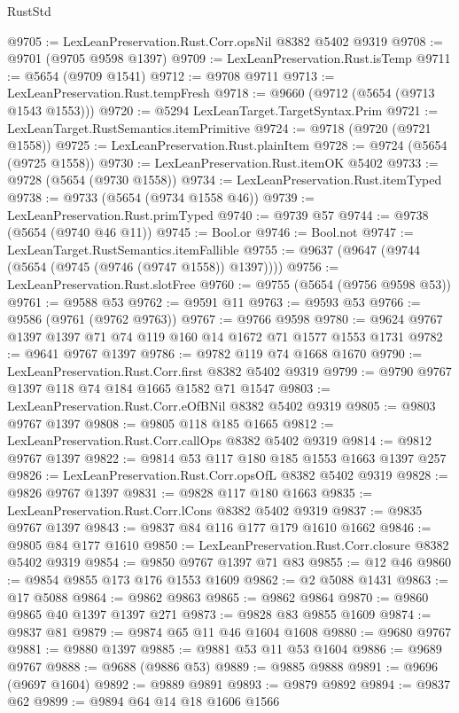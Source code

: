 \begin{lexlean}{RustStd}
\begin{coremodule}
@9705 := LexLeanPreservation.Rust.Corr.opsNil @8382 @5402 @9319
@9708 := @9701 (@9705 @9598 @1397)
@9709 := LexLeanPreservation.Rust.isTemp
@9711 := @5654 (@9709 @1541)
@9712 := @9708 @9711
@9713 := LexLeanPreservation.Rust.tempFresh
@9718 := @9660 (@9712 (@5654 (@9713 @1543 @1553)))
@9720 := @5294 LexLeanTarget.TargetSyntax.Prim
@9721 := LexLeanTarget.RustSemantics.itemPrimitive
@9724 := @9718 (@9720 (@9721 @1558))
@9725 := LexLeanPreservation.Rust.plainItem
@9728 := @9724 (@5654 (@9725 @1558))
@9730 := LexLeanPreservation.Rust.itemOK @5402
@9733 := @9728 (@5654 (@9730 @1558))
@9734 := LexLeanPreservation.Rust.itemTyped
@9738 := @9733 (@5654 (@9734 @1558 @46))
@9739 := LexLeanPreservation.Rust.primTyped
@9740 := @9739 @57
@9744 := @9738 (@5654 (@9740 @46 @11))
@9745 := Bool.or
@9746 := Bool.not
@9747 := LexLeanTarget.RustSemantics.itemFallible
@9755 := @9637 (@9647 (@9744 (@5654 (@9745 (@9746 (@9747 @1558)) @1397))))
@9756 := LexLeanPreservation.Rust.slotFree
@9760 := @9755 (@5654 (@9756 @9598 @53))
@9761 := @9588 @53
@9762 := @9591 @11
@9763 := @9593 @53
@9766 := @9586 (@9761 (@9762 @9763))
@9767 := @9766 @9598
@9780 := @9624 @9767 @1397 @1397 @71 @74 @119 @160 @14 @1672 @71 @1577 @1553 @1731
@9782 := @9641 @9767 @1397
@9786 := @9782 @119 @74 @1668 @1670
@9790 := LexLeanPreservation.Rust.Corr.first @8382 @5402 @9319
@9799 := @9790 @9767 @1397 @118 @74 @184 @1665 @1582 @71 @1547
@9803 := LexLeanPreservation.Rust.Corr.eOfBNil @8382 @5402 @9319
@9805 := @9803 @9767 @1397
@9808 := @9805 @118 @185 @1665
@9812 := LexLeanPreservation.Rust.Corr.callOps @8382 @5402 @9319
@9814 := @9812 @9767 @1397
@9822 := @9814 @53 @117 @180 @185 @1553 @1663 @1397 @257
@9826 := LexLeanPreservation.Rust.Corr.opsOfL @8382 @5402 @9319
@9828 := @9826 @9767 @1397
@9831 := @9828 @117 @180 @1663
@9835 := LexLeanPreservation.Rust.Corr.lCons @8382 @5402 @9319
@9837 := @9835 @9767 @1397
@9843 := @9837 @84 @116 @177 @179 @1610 @1662
@9846 := @9805 @84 @177 @1610
@9850 := LexLeanPreservation.Rust.Corr.closure @8382 @5402 @9319
@9854 := @9850 @9767 @1397 @71 @83
@9855 := @12 @46
@9860 := @9854 @9855 @173 @176 @1553 @1609
@9862 := @2 @5088 @1431
@9863 := @17 @5088
@9864 := @9862 @9863
@9865 := @9862 @9864
@9870 := @9860 @9865 @40 @1397 @1397 @271
@9873 := @9828 @83 @9855 @1609
@9874 := @9837 @81
@9879 := @9874 @65 @11 @46 @1604 @1608
@9880 := @9680 @9767
@9881 := @9880 @1397
@9885 := @9881 @53 @11 @53 @1604
@9886 := @9689 @9767
@9888 := @9688 (@9886 @53)
@9889 := @9885 @9888
@9891 := @9696 (@9697 @1604)
@9892 := @9889 @9891
@9893 := @9879 @9892
@9894 := @9837 @62
@9899 := @9894 @64 @14 @18 @1606 @1566

\end{coremodule}
\end{lexlean}
